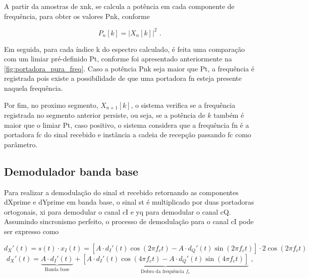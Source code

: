 A partir da amostras de \gls{xnk}, se calcula a potência em cada componente de frequência, para obter os valores \gls{Pnk}, conforme

\vspace{-0.4em}
\begin{equation}
    P_n[k] = |X_n[k]|^2 \text{ .}
\end{equation}

Em seguida, para cada índice \gls{k} do espectro calculado, é feita uma comparação com um limiar pré-definido \gls{Pt}, conforme foi apresentado anteriormente na \autoref{fig:portadora_pura_freq}. Caso a potência \gls{Pnk} seja maior que \gls{Pt}, a frequência é registrada pois existe a possibilidade de que uma portadora \gls{fn} esteja presente naquela frequência. 

Por fim, no proximo segmento, $X_{n+1}[k]$, o sistema verifica se a frequência registrada no segmento anterior persiste, ou seja, se a potência de $k$ também é maior que o limiar \gls{Pt}, caso positivo, o sistema considera que a frequência \gls{fn} é a portadora \gls{fc} do sinal recebido e instância a cadeia de recepção passando \gls{fc} como parâmetro.



\subsection{Demodulador banda base}

Para realizar a demodulação do sinal \gls{st} recebido retornando as componentes \gls{dXprime} e \gls{dYprime} em banda base, o sinal \gls{st} é multiplicado por duas portadoras ortogonais, \gls{xi} para demodular o canal \gls{cI} e \gls{yq} para demodular o canal \gls{cQ}. Assumindo sincronismo perfeito, o processo de demodulação para o canal \gls{cI} pode ser expresso como

\vspace{-1.2em}
\begin{equation}
d_X'(t) = s(t) \cdot x_I(t) = \left[A \cdot d_I'(t) \cos(2\pi f_c t ) - A \cdot d_Q'(t) \sin(2\pi f_c t )\right] \cdot 2\cos(2\pi f_c t )
\end{equation}
\vspace{-0.8em}
\begin{equation}
    d_X'(t) =
    \underbrace{A \cdot d_I'(t)}_{\text{Banda base}} + 
    \underbrace{\left[
        A \cdot d_I'(t) \cos(4\pi f_c t ) 
        - A \cdot d_Q'(t) \sin(4\pi f_c t )
    \right]}_{\text{Dobro da frequência $f_c$}} \text{ ,}
\end{equation}

